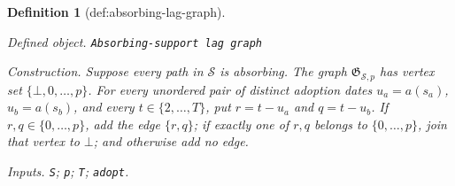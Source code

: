 \documentclass{article}
\newtheorem{definition}{Definition}
\begin{document}
\begin{definition}[def:absorbing-lag-graph]\label{def:absorbing-lag-graph}
\par\smallskip\noindent\emph{Defined object.} \texttt{Absorbing-\allowbreak{}support lag graph}
\par\smallskip\noindent\emph{Construction.} Suppose every path in \(\mathcal S\) is absorbing.  The graph \(\mathfrak G_{\mathcal S,p}\) has vertex set \(\{\bot,0,\ldots,p\}\).  For every unordered pair of distinct adoption dates \(u_a=a(s_a)\), \(u_b=a(s_b)\), and every \(t\in\{2,\ldots,T\}\), put \(r=t-u_a\) and \(q=t-u_b\).  If \(r,q\in\{0,\ldots,p\}\), add the edge \(\{r,q\}\); if exactly one of \(r,q\) belongs to \(\{0,\ldots,p\}\), join that vertex to \(\bot\); and otherwise add no edge.
\par\smallskip\noindent\emph{Inputs.} \texttt{S}; \texttt{p}; \texttt{T}; \texttt{adopt}.
\end{definition}
\end{document}
